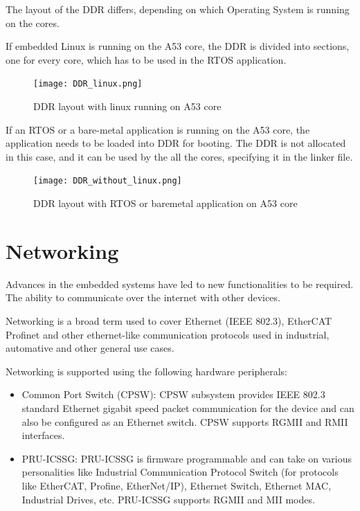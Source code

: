 The layout of the DDR differs, depending on which Operating System is running
on the cores.

If embedded Linux is running on the A53 core, the DDR is divided into sections,
one for every core, which has to be used in the RTOS application.

\begin{figure}[H]
    \centering
    \texttt{[image: DDR\_linux.png]}
    \caption{DDR layout with linux running on A53 core}
\end{figure}

If an RTOS or a bare-metal application is running on the A53 core, the
application needs to be loaded into DDR for booting.
The DDR is not allocated in this case, and it can be used by the all the cores,
specifying it in the linker file.

\begin{figure}[H]
    \centering
    \texttt{[image: DDR\_without\_linux.png]}
    \caption{DDR layout with RTOS or baremetal application on A53 core}
\end{figure}

\section{Networking}

Advances in the embedded systems have led to new functionalities to be
required. The ability to communicate over the internet with other devices.

Networking is a broad term used to cover Ethernet (IEEE 802.3), EtherCAT
Profinet and other ethernet-like communication protocols used in industrial,
automative and other general use cases.

Networking is supported using the following hardware peripherals:

\begin{itemize}
    \item   Common Port Switch (CPSW): CPSW subsystem provides IEEE 802.3
            standard Ethernet gigabit speed packet communication for the
            device and can also be configured as an Ethernet switch.
            CPSW supports RGMII and RMII interfaces.
    
    \item   PRU-ICSSG: PRU-ICSSG is firmware programmable and can take on
            various personalities like Industrial Communication Protocol Switch
            (for protocols like EtherCAT, Profine, EtherNet/IP), Ethernet
            Switch, Ethernet MAC, Industrial Drives, etc. PRU-ICSSG supports
            RGMII and MII modes.
\end{itemize}

